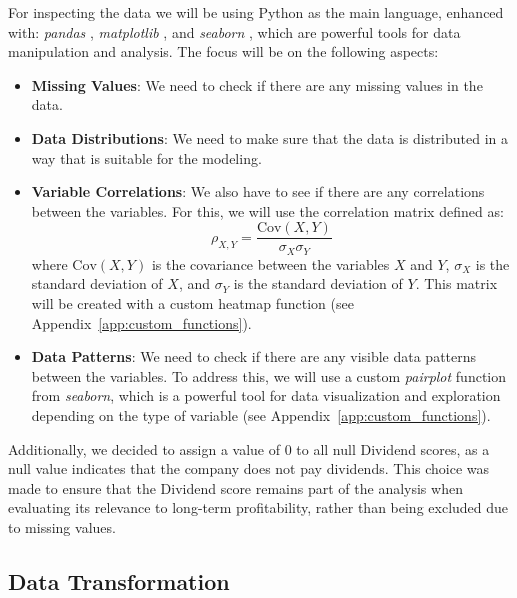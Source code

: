 \documentclass[11pt,english,a4paper,hidelinks]{book}
\begin{document}
\vspace{0.5cm}
\noindent For inspecting the data we will be using Python as the main language, enhanced with: \textit{pandas} \cite{pandas2024}, \textit{matplotlib} \cite{matplotlib2025doc}, and \textit{seaborn} \cite{seaborn2024}, which are powerful tools for data manipulation and analysis. The focus will be on the following aspects:
\begin{itemize}
  \item \textbf{Missing Values}: We need to check if there are any missing values in the data.
  \item \textbf{Data Distributions}: We need to make sure that the data is distributed in a way that is suitable for the modeling.
  \item \textbf{Variable Correlations}: We also have to see if there are any correlations between the variables. For this, we will use the correlation matrix defined as:
  \begin{equation}
    \rho_{X,Y} = \frac{\text{Cov}(X,Y)}{\sigma_X \sigma_Y}
  \end{equation}
  where \(\text{Cov}(X,Y)\) is the covariance between the variables \(X\) and \(Y\), \(\sigma_X\) is the standard deviation of \(X\), and \(\sigma_Y\) is the standard deviation of \(Y\). This matrix will be created with a custom heatmap function (see Appendix~\ref{app:custom_functions}).
  \item \textbf{Data Patterns}: We need to check if there are any visible data patterns between the variables. To address this, we will use a custom \textit{pairplot} function from \textit{seaborn}, which is a powerful tool for data visualization and exploration  depending on the type of variable (see Appendix~\ref{app:custom_functions}).
\end{itemize}

\vspace{0.5cm}
\noindent Additionally, we decided to assign a value of 0 to all null Dividend scores, as a null value indicates that the company does not pay dividends. This choice was made to ensure that the Dividend score remains part of the analysis when evaluating its relevance to long-term profitability, rather than being excluded due to missing values.


\subsection{Data Transformation}
\end{document}
